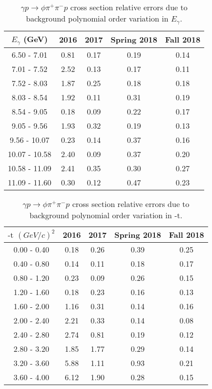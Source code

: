 \begin{table}[!htbp]
    \centering
    \caption{$\gamma p \rightarrow \phi \pi^{+} \pi^{-} p$ cross section relative errors due to background polynomial order variation in $E_{\gamma}$.}
    \label{tab.syserr.5.1.1}
    \begin{tabular}{|c|c|c|c|c|}
        \hline
        $E_{\gamma}$ (GeV) & 2016 & 2017 & Spring 2018 & Fall 2018 \\
        \hline
        6.50 - 7.01 & 0.81 & 0.17 & 0.19 & 0.14 \\
        7.01 - 7.52 & 2.52 & 0.13 & 0.17 & 0.11 \\
        7.52 - 8.03 & 1.87 & 0.25 & 0.18 & 0.18 \\
        8.03 - 8.54 & 1.92 & 0.11 & 0.31 & 0.19 \\
        8.54 - 9.05 & 0.18 & 0.09 & 0.22 & 0.17 \\
        9.05 - 9.56 & 1.93 & 0.32 & 0.19 & 0.13 \\
        9.56 - 10.07 & 0.23 & 0.14 & 0.37 & 0.16 \\
        10.07 - 10.58 & 2.40 & 0.09 & 0.37 & 0.20 \\
        10.58 - 11.09 & 2.41 & 0.35 & 0.30 & 0.27 \\
        11.09 - 11.60 & 0.30 & 0.12 & 0.47 & 0.23 \\
        \hline
    \end{tabular}
\end{table}

\begin{table}[!htbp]
    \centering
    \caption{$\gamma p \rightarrow \phi \pi^{+} \pi^{-} p$ cross section relative errors due to background polynomial order variation in $\mbox{-t}$.}
    \label{tab.syserr.5.1.2}
    \begin{tabular}{|c|c|c|c|c|}
        \hline
        $\mbox{-t}$ $(GeV/c)^{2}$ & 2016 & 2017 & Spring 2018 & Fall 2018 \\
        \hline
        0.00 - 0.40 & 0.18 & 0.26 & 0.39 & 0.25 \\ 
        0.40 - 0.80 & 0.14 & 0.11 & 0.18 & 0.17 \\ 
        0.80 - 1.20 & 0.23 & 0.09 & 0.26 & 0.15 \\ 
        1.20 - 1.60 & 0.18 & 0.23 & 0.16 & 0.13 \\ 
        1.60 - 2.00 & 1.16 & 0.31 & 0.14 & 0.16 \\ 
        2.00 - 2.40 & 2.21 & 0.33 & 0.14 & 0.08 \\ 
        2.40 - 2.80 & 2.74 & 0.81 & 0.19 & 0.12 \\  
        2.80 - 3.20 & 1.85 & 1.77 & 0.29 & 0.14 \\ 
        3.20 - 3.60 & 5.88 & 1.11 & 0.93 & 0.21 \\ 
        3.60 - 4.00 & 6.12 & 1.90 & 0.28 & 0.15 \\ 
        \hline
    \end{tabular}
\end{table}

